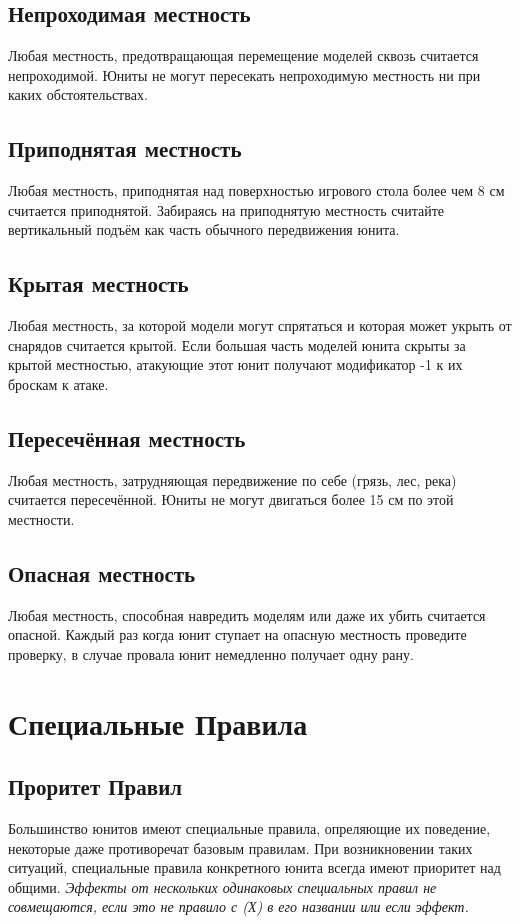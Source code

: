 \documentclass[twocolumn]{article}
\begin{document}
\subsection{Непроходимая местность}
Любая местность, предотвращающая перемещение моделей сквозь считается непроходимой. Юниты не могут пересекать непроходимую местность ни при каких обстоятельствах.

\subsection{Приподнятая местность}
Любая местность, приподнятая над поверхностью игрового стола более чем 8 см считается приподнятой. Забираясь на приподнятую местность считайте вертикальный подъём как часть обычного передвижения юнита.

\subsection{Крытая местность}
Любая местность, за которой модели могут спрятаться и которая может укрыть от снарядов считается крытой. Если большая часть моделей юнита скрыты за крытой местностью, атакующие этот юнит получают модификатор -1 к их броскам к атаке.

\subsection{Пересечённая местность}
Любая местность, затрудняющая передвижение по себе (грязь, лес, река) считается пересечённой. Юниты не могут двигаться более 15 см по этой местности.

\subsection{Опасная местность}
Любая местность, способная навредить моделям или даже их убить считается опасной. Каждый раз когда юнит ступает на опасную местность проведите проверку, в случае провала юнит немедленно получает одну рану.

\newpage

\section{Специальные Правила}
\subsection{Проритет Правил}
Большинство юнитов имеют специальные правила, опреляющие их поведение, некоторые даже противоречат базовым правилам. При возникновении таких ситуаций, специальные правила конкретного юнита всегда имеют приоритет над общими. \emph{Эффекты от нескольких одинаковых специальных правил не совмещаются, если это не правило с (Х) в его названии или если эффект.}
\end{document}

